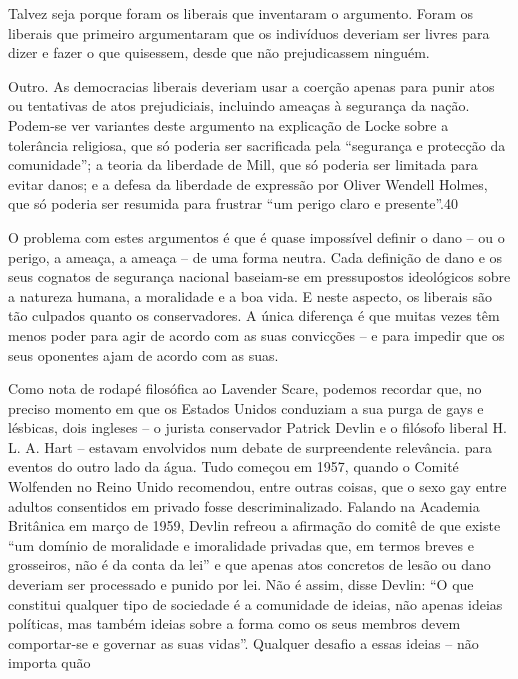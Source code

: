  \par 
Talvez seja porque foram os liberais que inventaram o argumento. Foram os liberais que primeiro argumentaram que os indivíduos deveriam ser livres para dizer e fazer o que quisessem, desde que não prejudicassem ninguém.
 \par 
Outro. As democracias liberais deveriam usar a coerção apenas para punir atos ou tentativas de atos prejudiciais, incluindo ameaças à segurança da nação. Podem-se ver variantes deste argumento na explicação de Locke sobre a tolerância religiosa, que só poderia ser sacrificada pela “segurança e protecção da comunidade”; a teoria da liberdade de Mill, que só poderia ser limitada para evitar danos; e a defesa da liberdade de expressão por Oliver Wendell Holmes, que só poderia ser resumida para frustrar “um perigo claro e presente”.{\color{blue}40}
 \par 
O problema com estes argumentos é que é quase impossível definir o dano – ou o perigo, a ameaça, a ameaça – de uma forma neutra. Cada definição de dano e os seus cognatos de segurança nacional baseiam-se em pressupostos ideológicos sobre a natureza humana, a moralidade e a boa vida. E neste aspecto, os liberais são tão culpados quanto os conservadores. A única diferença é que muitas vezes têm menos poder para agir de acordo com as suas convicções – e para impedir que os seus oponentes ajam de acordo com as suas.
 \par 
Como nota de rodapé filosófica ao Lavender Scare, podemos recordar que, no preciso momento em que os Estados Unidos conduziam a sua purga de gays e lésbicas, dois ingleses – o jurista conservador Patrick Devlin e o filósofo liberal H. L. A. Hart – estavam envolvidos num debate de surpreendente relevância. para eventos do outro lado da água. Tudo começou em 1957, quando o Comité Wolfenden no Reino Unido recomendou, entre outras coisas, que o sexo gay entre adultos consentidos em privado fosse descriminalizado. Falando na Academia Britânica em março de 1959, Devlin refreou a afirmação do comitê de que existe “um domínio de moralidade e imoralidade privadas que, em termos breves e grosseiros, não é da conta da lei” e que apenas atos concretos de lesão ou dano deveriam ser processado e punido por lei. Não é assim, disse Devlin: “O que constitui qualquer tipo de sociedade é a comunidade de ideias, não apenas ideias políticas, mas também ideias sobre a forma como os seus membros devem comportar-se e governar as suas vidas”. Qualquer desafio a essas ideias – não importa quão
 \par 
